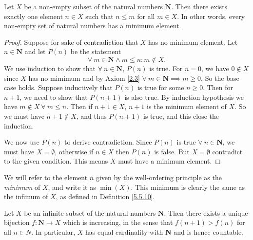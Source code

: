 \begin{proposition}\label{8.1.4}
Let \(X\) be a non-empty subset of the natural numbers \(\mathbf{N}\).
Then there exists exactly one element \(n \in X\) such that \(n \leq m\) for all \(m \in X\).
In other words, every non-empty set of natural numbers has a minimum element.
\end{proposition}

\begin{proof}
Suppose for sake of contradiction that \(X\) has no minimum element.
Let \(n \in \mathbf{N}\) and let \(P(n)\) be the statement
\[
    \forall\ m \in \mathbf{N} \land m \leq n : m \notin X.
\]
We use induction to show that \(\forall\ n \in \mathbf{N}\), \(P(n)\) is true.
For \(n = 0\), we have \(0 \notin X\) since \(X\) has no mimimum and by Axiom \ref{2.3} \(\forall\ m \in \mathbf{N} \implies m \geq 0\).
So the base case holds.
Suppose inductively that \(P(n)\) is true for some \(n \geq 0\).
Then for \(n + 1\), we need to show that \(P(n + 1)\) is also true.
By induction hypothesis we have \(m \notin X \ \forall\ m \leq n\).
Then if \(n + 1 \in X\), \(n + 1\) is the minimum element of \(X\).
So we must have \(n + 1 \notin X\), and thus \(P(n + 1)\) is true, and this close the induction.

We now use \(P(n)\) to derive contradiction.
Since \(P(n)\) is true \(\forall\ n \in \mathbf{N}\), we must have \(X = \emptyset\), otherwise if \(n \in X\) then \(P(n)\) is false.
But \(X = \emptyset\) contradict to the given condition.
This means \(X\) must have a minimum element.
\end{proof}

\begin{note}
We will refer to the element \(n\) given by the well-ordering principle as the \emph{minimum} of \(X\), and write it as \(\min(X)\).
This minimum is clearly the same as the infimum of \(X\), as defined in Definition \ref{5.5.10}.
\end{note}

\begin{proposition}\label{8.1.5}
Let \(X\) be an infinite subset of the natural numbers \(\mathbf{N}\).
Then there exists a unique bijection \(f : \mathbf{N} \to X\) which is increasing, in the sense that \(f(n + 1) > f(n)\) for all \(n \in N\).
In particular, \(X\) has equal cardinality with \(\mathbf{N}\) and is hence countable.
\end{proposition}

